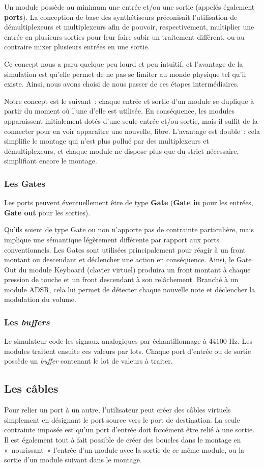 Un module possède au minimum une entrée et/ou une sortie (appelés
également \textbf{ports}). La conception de base des synthétiseurs
préconisait l'utilisation de démultiplexeurs et multiplexeurs afin
de pouvoir, respectivement, multiplier une entrée en plusieurs
sorties pour leur faire subir un traitement différent, ou au
contraire mixer plusieurs entrées en une sortie.

Ce concept nous a paru quelque peu lourd et peu intuitif, et
l'avantage de la simulation est qu'elle permet de
ne pas se limiter au monde physique tel qu'il existe. Ainsi, nous
avons choisi de nous passer de ces étapes intermédiaires.

Notre concept est le suivant~: chaque entrée et sortie d'un module
se duplique à partir du moment où l'une d'elle est utilisée. En
conséquence, les modules apparaissent initialement dotés d'une
seule entrée et/ou sortie, mais il suffit de la connecter
pour en voir apparaître une nouvelle, libre. L'avantage est double~: cela simplifie le montage qui n'est plus pollué par des
multiplexeurs et démultiplexeurs, et chaque module ne dispose plus
que du strict nécessaire, simplifiant encore le montage.

\subsubsection{Les Gates}

Les ports peuvent éventuellement être de type \textbf{Gate} (\textbf{Gate
in} pour les entrées, \textbf{Gate out} pour les sorties).

Qu'ils soient de type Gate ou non n'apporte pas de contrainte
particulière, mais implique une sémantique légèrement différente
par rapport aux ports conventionnels. Les Gates sont utilisées
principalement pour réagir à un front montant ou descendant et
déclencher une action en conséquence. Ainsi, le Gate Out du module
Keyboard (clavier virtuel) produira un front montant à chaque
pression de touche et un front descendant à son relâchement.
Branché à un module ADSR, cela lui permet de détecter chaque
nouvelle note et déclencher la modulation du volume.

\subsubsection{Les \emph{buffers}}

Le simulateur code les signaux analogiques par échantillonnage à $44100$ Hz. Les modules
traitent ensuite ces valeurs par lots. Chaque port d'entrée ou de sortie possède un
\emph{buffer} contenant le lot de valeurs à traiter.

\subsection{Les câbles}

Pour relier un port à un autre, l'utilisateur peut créer des câbles
virtuels simplement en désignant le port source vers le port de
destination. La seule contrainte imposée est qu'un port d'entrée
doit forcément être relié à une sortie. Il est également tout à
fait possible de créer des boucles dans le montage en
«~nourissant~» l'entrée d'un module avec la sortie de ce même
module, ou la sortie d'un module suivant dans le montage.
